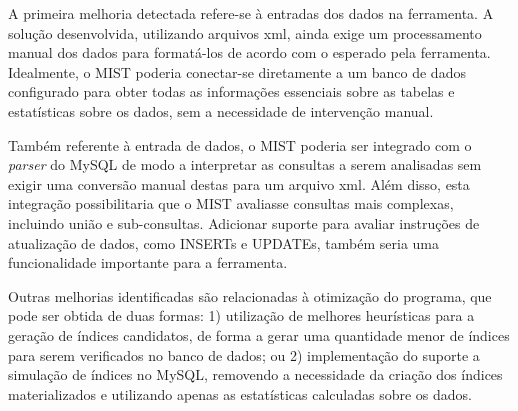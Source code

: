 A primeira melhoria detectada refere-se à entradas dos dados na ferramenta. A solução desenvolvida, utilizando arquivos \gls{xml}, ainda exige um processamento manual dos dados para formatá-los de acordo com o esperado pela ferramenta. Idealmente, o MIST poderia conectar-se diretamente a um banco de dados configurado para obter todas as informações essenciais sobre as tabelas e estatísticas sobre os dados, sem a necessidade de intervenção manual.

Também referente à entrada de dados, o MIST poderia ser integrado com o \emph{parser} do MySQL de modo a interpretar as consultas a serem analisadas sem exigir uma conversão manual destas para um arquivo \gls{xml}. Além disso, esta integração possibilitaria que o MIST avaliasse consultas mais complexas, incluindo união e sub-consultas. Adicionar suporte para avaliar instruções de atualização de dados, como INSERTs e UPDATEs, também seria uma funcionalidade importante para a ferramenta.

Outras melhorias identificadas são relacionadas à otimização do programa, que pode ser obtida de duas formas: 1) utilização de melhores heurísticas para a geração de índices candidatos, de forma a gerar uma quantidade menor de índices para serem verificados no banco de dados; ou 2) implementação do suporte a simulação de índices no MySQL, removendo a necessidade da criação dos índices materializados e utilizando apenas as estatísticas calculadas sobre os dados.
